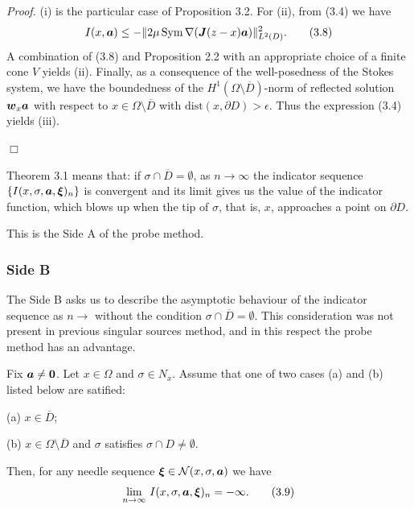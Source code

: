 \endproclaim

{\it\noindent Proof.}  (i)  is the particular case of Proposition 3.2.
For (ii), from (3.4) we have
$$\displaystyle
I(x,\mbox{\boldmath $a$})\le
-\Vert 2\mu\,\text{Sym}\,\nabla(\mbox{\boldmath $J$}(z-x)\mbox{\boldmath $a$})\Vert_{L^2(D)}^2.
\tag {3.8}
$$
A combination of (3.8) and Proposition 2.2 with an appropriate choice of a finite cone $V$ yields (ii).
Finally, as a consequence of the well-posedness of the Stokes system, we have
the boundedness of the $H^1(\Omega\setminus\overline{D})$-norm
of  reflected solution $\mbox{\boldmath $w$}_x\mbox{\boldmath $a$}$ with respect to $x\in\Omega\setminus\overline{D}$ with $\text{dist}(x,\partial D)>\epsilon$. 
Thus the expression (3.4) yields (iii).


\noindent
$\Box$


\noindent
Theorem 3.1 means that:
if $\sigma\cap\overline{D}=\emptyset$,
as $n\rightarrow\infty$
the indicator sequence $\{I(x,\sigma,\mbox{\boldmath $a$},\mbox{\boldmath $\xi$})_n\}$ is convergent
and its limit gives us the value of the indicator function, which blows up when the tip of $\sigma$, that is,
$x$, approaches a point on $\partial D$.

\noindent
This is the Side A of the probe method.






\subsubsection{Side B}


The Side B asks us to describe the asymptotic behaviour of the indicator sequence as $n\rightarrow$
without the condition $\sigma\cap\overline{D}=\emptyset$.
This consideration was not present in previous singular sources method, and in this respect the probe method has an advantage.


  Fix $\mbox{\boldmath $a$}\not=\mbox{\boldmath $0$}$.
Let $x\in\Omega$ and $\sigma\in N_x$.
Assume that one of two cases (a) and (b) listed below are satified:


\noindent
(a)  $x\in\overline{D}$;

 \noindent
 (b)  $x\in\Omega\setminus\overline{D}$ and $\sigma$ satisfies $\sigma\cap D\not=\emptyset$.
 
\noindent
Then, for any needle sequence $\mbox{\boldmath $\xi$}\in{\cal N}(x,\sigma,\mbox{\boldmath $a$})$ we have
$$\displaystyle
\lim_{n\rightarrow\infty}\,I(x,\sigma,\mbox{\boldmath $a$},\mbox{\boldmath $\xi$})_n=-\infty.
\tag {3.9}
$$
\endproclaim

